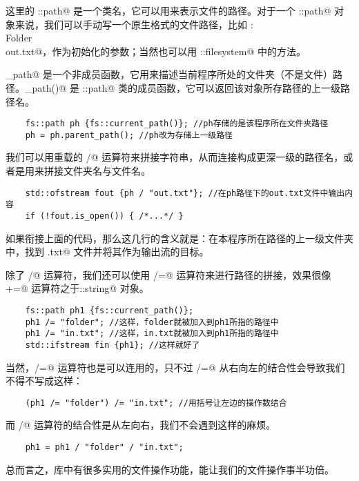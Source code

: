 这里的 \lstinline@fs::path@ 是一个类名，它可以用来表示文件的路径。对于一个 \lstinline@fs::path@ 对象来说，我们可以手动写一个原生格式的文件路径，比如 \lstinline@D:\\Folder\\out.txt@，作为初始化的参数；当然也可以用 \lstinline@std::filesystem@ 中的方法。\par
\lstinline@current_path@ 是一个非成员函数，它用来描述当前程序所处的文件夹（不是文件）路径。\linebreak\lstinline@parent_path()@ 是 \lstinline@fs::path@ 类的成员函数，它可以返回该对象所存路径的上一级路径名。
\begin{lstlisting}
    fs::path ph {fs::current_path()}; //ph存储的是该程序所在文件夹路径
    ph = ph.parent_path(); //ph改为存储上一级路径
\end{lstlisting}
我们可以用重载的 \lstinline@/@ 运算符来拼接字符串，从而连接构成更深一级的路径名，或者是用来拼接文件夹名与文件名。
\begin{lstlisting}
    std::ofstream fout {ph / "out.txt"}; //在ph路径下的out.txt文件中输出内容
    if (!fout.is_open()) { /*...*/ }
\end{lstlisting}
如果衔接上面的代码，那么这几行的含义就是：在本程序所在路径的上一级文件夹中，找到 \lstinline@out.txt@ 文件并将其作为输出流的目标。\par
除了 \lstinline@/@ 运算符，我们还可以使用 \lstinline@/=@ 运算符来进行路径的拼接，效果很像 \lstinline@+=@ 运算符之于\linebreak\lstinline@std::string@ 对象。\par
\begin{lstlisting}
    fs::path ph1 {fs::current_path()};
    ph1 /= "folder"; //这样，folder就被加入到ph1所指的路径中
    ph1 /= "in.txt"; //这样，in.txt就被加入到ph1所指的路径中
    std::ifstream fin {ph1}; //这样就好了
\end{lstlisting}
当然，\lstinline@/=@ 运算符也是可以连用的，只不过 \lstinline@/=@ 从右向左的结合性会导致我们不得不写成这样：
\begin{lstlisting}
    (ph1 /= "folder") /= "in.txt"; //用括号让左边的操作数结合
\end{lstlisting}
而 \lstinline@/@ 运算符的结合性是从左向右，我们不会遇到这样的麻烦。
\begin{lstlisting}
    ph1 = ph1 / "folder" / "in.txt";
\end{lstlisting}\par
总而言之，\lstinline@filesystem@ 库中有很多实用的文件操作功能，能让我们的文件操作事半功倍。\par
